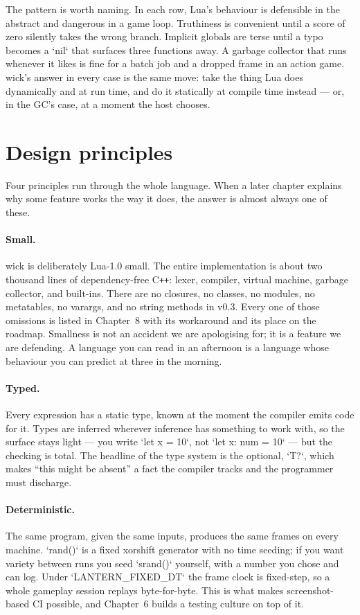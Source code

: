 The pattern is worth naming. In each row, Lua's behaviour is defensible in
the abstract and dangerous in a game loop. Truthiness is convenient until a
score of zero silently takes the wrong branch. Implicit globals are terse
until a typo becomes a `nil` that surfaces three functions away. A garbage
collector that runs whenever it likes is fine for a batch job and a dropped
frame in an action game. wick's answer in every case is the same move: take
the thing Lua does dynamically and at run time, and do it statically at
compile time instead --- or, in the GC's case, at a moment the host chooses.

\section{Design principles}

Four principles run through the whole language. When a later chapter explains
why some feature works the way it does, the answer is almost always one of
these.

\paragraph{Small.} wick is deliberately Lua-1.0 small. The entire
implementation is about two thousand lines of dependency-free \mbox{C\texttt{++}}:
lexer, compiler, virtual machine, garbage collector, and built-ins. There
are no closures, no classes, no modules, no metatables, no varargs, and no
string methods in v0.3. Every one of those omissions is listed in
Chapter~8 with its workaround and its place on the roadmap. Smallness is not
an accident we are apologising for; it is a feature we are defending. A
language you can read in an afternoon is a language whose behaviour you can
predict at three in the morning.

\paragraph{Typed.} Every expression has a static type, known at the moment
the compiler emits code for it. Types are inferred wherever inference has
something to work with, so the surface stays light --- you write `let x = 10`,
not `let x: num = 10` --- but the checking is total. The headline of the type
system is the optional, `T?`, which makes ``this might be absent'' a fact the
compiler tracks and the programmer must discharge.

\paragraph{Deterministic.} The same program, given the same inputs, produces
the same frames on every machine. `rand()` is a fixed xorshift generator with
no time seeding; if you want variety between runs you seed `srand()` yourself,
with a number you chose and can log. Under `LANTERN_FIXED_DT` the frame clock
is fixed-step, so a whole gameplay session replays byte-for-byte. This is
what makes screenshot-based CI possible, and Chapter~6 builds a testing
culture on top of it.

